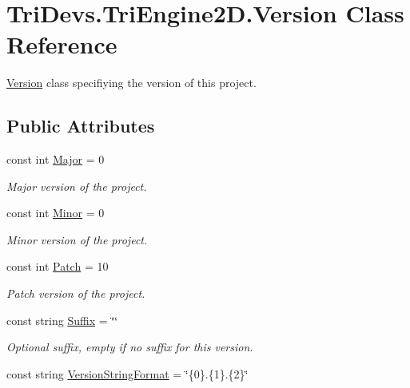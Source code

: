 \hypertarget{class_tri_devs_1_1_tri_engine2_d_1_1_version}{\section{Tri\-Devs.\-Tri\-Engine2\-D.\-Version Class Reference}
\label{class_tri_devs_1_1_tri_engine2_d_1_1_version}
}


\hyperlink{class_tri_devs_1_1_tri_engine2_d_1_1_version}{Version} class specifiying the version of this project.  


\subsection*{Public Attributes}
\begin{DoxyCompactItemize}
\item 
const int \hyperlink{class_tri_devs_1_1_tri_engine2_d_1_1_version_adf7439103e5307870f8a9b953e9f3933}{Major} = 0
\begin{DoxyCompactList}\small\item\em Major version of the project. \end{DoxyCompactList}\item 
const int \hyperlink{class_tri_devs_1_1_tri_engine2_d_1_1_version_a46c99b37d8caad10a9702e9823f6cded}{Minor} = 0
\begin{DoxyCompactList}\small\item\em Minor version of the project. \end{DoxyCompactList}\item 
const int \hyperlink{class_tri_devs_1_1_tri_engine2_d_1_1_version_a5baa982b0404ea5ed3d2526e26f55809}{Patch} = 10
\begin{DoxyCompactList}\small\item\em Patch version of the project. \end{DoxyCompactList}\item 
const string \hyperlink{class_tri_devs_1_1_tri_engine2_d_1_1_version_a5f7a61ae54163decac64e6acbe25e76d}{Suffix} = \char`\"{}\char`\"{}
\begin{DoxyCompactList}\small\item\em Optional suffix, empty if no suffix for this version. \end{DoxyCompactList}\item 
const string \hyperlink{class_tri_devs_1_1_tri_engine2_d_1_1_version_a7ff4d8681e4833ef71067425aac665e4}{Version\-String\-Format} = \char`\"{}\{0\}.\{1\}.\{2\}\char`\"{}

\end{DoxyCompactItemize}
